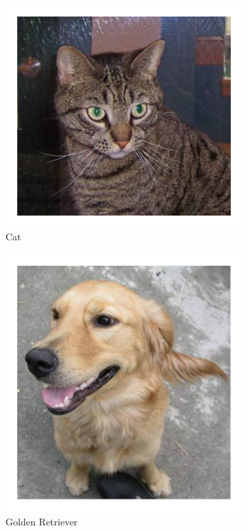\documentclass[draft, ../thesis.tex]{subfiles}
\begin{document}
    \begin{figure}
    	\centering
    	\begin{subfigure}[b]{.30\linewidth}
    		\centering
    		\includegraphics[width=.7\linewidth]{images/cat}
    		\caption{Cat}
    	\end{subfigure}
    	\begin{subfigure}[b]{.3\linewidth}
    		\centering
    		\includegraphics[width=.7\linewidth]{images/golden}
    		\caption{Golden Retriever}
    		\label{fig:golden}
    	\end{subfigure}
    	\begin{subfigure}[b]{.3\linewidth}
    		\centering

\end{subfigure}
\end{figure}
\end{document}
